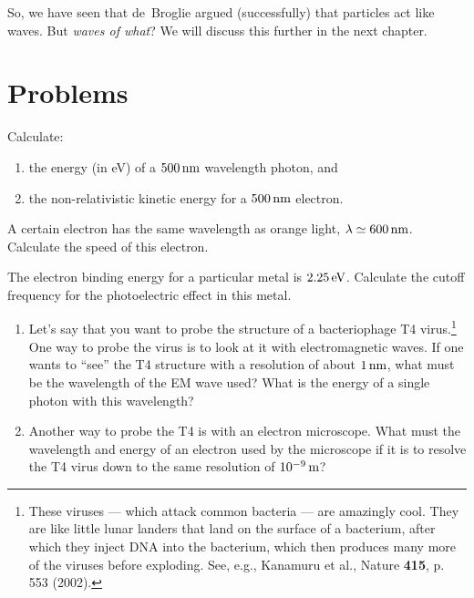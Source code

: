 So, we have seen that de~Broglie argued (successfully) that particles
act like waves.  But {\it waves of what}?  We will discuss this further
in the next chapter.

\vfill

\newpage

\section*{Problems}


\begin{problem}
Calculate: 
\begin{enumerate}
\item the energy (in eV) of a $500\,\mbox{nm}$ wavelength photon,
and 
\item the non-relativistic kinetic energy for a $500\,\mbox{nm}$
electron.
\end{enumerate}
\label{prob:photonenergy}
\end{problem}

\begin{problem}
A certain electron has the same wavelength as orange light, $\lambda \simeq
600\,\mbox{nm}$.   Calculate the speed of this electron.
\end{problem}

\begin{problem}
The electron binding energy for a particular metal is
$2.25\,\mbox{eV}$.  Calculate the cutoff frequency for the
photoelectric effect in this metal.
\label{prob:cutoff_freq}
\end{problem}

\begin{problem}
\begin{enumerate}

\item Let's say that you want to probe the structure of a bacteriophage
T4 virus.\footnote{These viruses --- which attack common bacteria ---
are amazingly cool. They are like little lunar landers that land on the
surface of a bacterium, after which they inject DNA into the bacterium,
which then produces many more of the viruses before exploding.  See,
e.g., Kanamuru et al., Nature {\bf 415}, p. 553 (2002).} One way to probe
the virus is to look at it with electromagnetic waves.  If one wants
to ``see'' the T4 structure with a resolution of about 
$1\,\mbox{nm}$, what must be the wavelength of the EM wave used?
What is the energy of a single photon with this wavelength?

\item Another way to probe the T4 is with an electron microscope.
  What must the wavelength and energy of an electron used by the 
  microscope if it is to resolve the T4 virus down to the same resolution of
  $10^{-9}\,\mbox{m}$?
\end{enumerate}
\label{prob:T4virus}
\end{problem}


